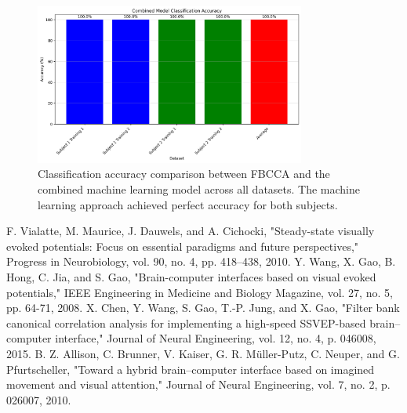 \documentclass[conference]{IEEEtran}
\begin{document}
\begin{figure}[!t]
\centering
\includegraphics[width=3.5in]{images/combined_classification_accuracy.png}
\caption{Classification accuracy comparison between FBCCA and the combined machine learning model across all datasets. The machine learning approach achieved perfect accuracy for both subjects.}
\label{fig:accuracy_comparison}
\end{figure}


\begin{thebibliography}{00}
 F. Vialatte, M. Maurice, J. Dauwels, and A. Cichocki, "Steady-state visually evoked potentials: Focus on essential paradigms and future perspectives," Progress in Neurobiology, vol. 90, no. 4, pp. 418–438, 2010.
 Y. Wang, X. Gao, B. Hong, C. Jia, and S. Gao, "Brain-computer interfaces based on visual evoked potentials," IEEE Engineering in Medicine and Biology Magazine, vol. 27, no. 5, pp. 64-71, 2008.
 X. Chen, Y. Wang, S. Gao, T.-P. Jung, and X. Gao, "Filter bank canonical correlation analysis for implementing a high-speed SSVEP-based brain–computer interface," Journal of Neural Engineering, vol. 12, no. 4, p. 046008, 2015.
 B. Z. Allison, C. Brunner, V. Kaiser, G. R. Müller-Putz, C. Neuper, and G. Pfurtscheller, "Toward a hybrid brain–computer interface based on imagined movement and visual attention," Journal of Neural Engineering, vol. 7, no. 2, p. 026007, 2010.
\end{thebibliography}
\end{document}
